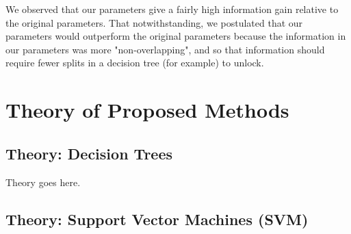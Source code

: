 \documentclass[fleqn]{article}
\begin{document}
We observed that our parameters give a fairly high information gain relative to the original parameters. That notwithstanding, we postulated that our parameters would outperform the original parameters because the information in our parameters was more "non-overlapping", and so that information should require fewer splits in a decision tree (for example) to unlock.
 

\section{Theory of Proposed Methods}
\label{sec:Theory}

\subsection{Theory: Decision Trees}
\label{sub:theoryDecisionTrees}
Theory goes here.

\subsection{Theory: Support Vector Machines (SVM)}
\label{sub:theorySVM}
\end{document}
